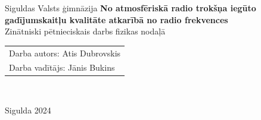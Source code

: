 \documentclass[12pt]{article}
\begin{document}
	\begin{titlepage}
		\begin{center}
			\vspace*{0.5cm}
			\begin{large}{Siguldas Valsts ģimnāzija}
                \vfill
                \textbf{No atmosfēriskā radio trokšņa iegūto gadījumskaitļu kvalitāte atkarībā no radio frekvences}
                \\Zinātniski pētnieciskais darbs fizikas nodaļā
                \vfill
				
			\end{large}
		\end{center}
		\vspace{3cm}
	
        {\raggedleft
        \begin{tabular}{l@{}}
        Darba autors: Atis Dubrovskis\\
        Darba vadītājs: Jānis Bukins\\
        \end{tabular}\par}\
		\vspace{3cm}
		\begin{center}
			Sigulda 2024
		\end{center}
	\end{titlepage}
\end{document}
